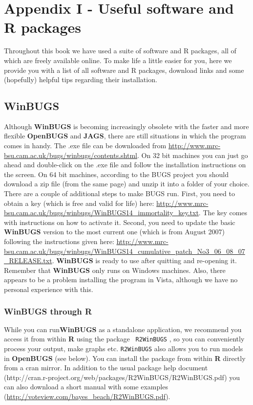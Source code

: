 
\chapter*{Appendix I - Useful software and R packages}
\label{chapt.app1}

\vspace{.3in}

Throughout this book we have used a suite of software and R packages,
all of which are freely available online. To make life a little easier
for you, here we provide you with a list of all software and R
packages, download links and some (hopefully) helpful tips regarding
their installation.


\section{WinBUGS} 

Although {\bf WinBUGS} \citep{gilks_etal:1994} is becoming
increasingly obsolete with the faster and more flexible {\bf OpenBUGS}
and {\bf JAGS}, there are still situations in which the program comes
in handy.  The .exe file can be downloaded from
\url{http://www.mrc-bsu.cam.ac.uk/bugs/winbugs/contents.shtml}. On 32
bit machines you can just go ahead and double-click on the .exe file
and follow the installation instructions on the screen.  On 64 bit
machines, according to the BUGS project you should download a zip file
(from the same page) and unzip it into a folder of your choice.  There
are a couple of additional steps to make BUGS run.  First, you need to
obtain a key (which is free and valid for life) here:
\url{http://www.mrc-bsu.cam.ac.uk/bugs/winbugs/WinBUGS14_immortality_key.txt}. The
key comes with instructions on how to activate it.  Second, you need
to update the basic {\bf WinBUGS} version to the most current one
(which is from August 2007) following the instructions given here:
\url{http://www.mrc-bsu.cam.ac.uk/bugs/winbugs/WinBUGS14_cumulative_patch_No3_06_08_07_RELEASE.txt}.
{\bf WinBUGS} is ready to use after quitting and re-opening it.
Remember that {\bf WinBUGS} only runs on Windows machines. Also, there
appears to be a problem installing the program in Vista, although we
have no personal experience with this.

\subsection{WinBUGS through R}

While you can run{\bf WinBUGS} as a standalone application, we
recommend you access it from within {\bf R} using the package {\tt
  R2WinBUGS} \citep{sturtz_etal:2005}, so you can conveniently process
your output, make graphs etc.  {\tt R2WinBUGS} also allows you to run
models in {\bf OpenBUGS} (see below). You can install the package from
within {\bf R} directly from a cran mirror. In addition to the usual
package help document
(http://cran.r-project.org/web/packages/R2WinBUGS/R2WinBUGS.pdf) you
can also download a short manual with some examples
(\url{http://voteview.com/bayes_beach/R2WinBUGS.pdf}).



